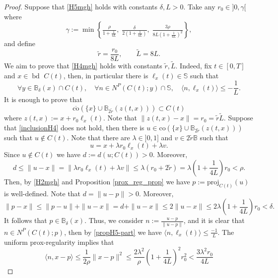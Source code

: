 \documentclass[preprint,12pt]{elsarticle}
\def \B{\mathbb{B}}
\newcommand{\bd}{{\operatorname{bd \ }}}
\theoremstyle{plain}
\theoremstyle{definition}
\theoremstyle{remark}
\begin{document}
    \begin{proof} Suppose that \ref{H5mgh} holds with constants $\delta, L>0$. Take any $r_0\in ]0,\gamma[$ where
    \[
\gamma:=
\min\left\{
\tfrac{\rho}{1+\frac{1}{4L}},
\;
\tfrac{\delta}{2\left(1+\frac{1}{4L}\right)},
\;
\tfrac{3\rho}{8L\left(1+\frac{1}{4L}\right)^2}
\right\},
\]
and define
\[
\tilde r=\frac{r_0}{8L},
\qquad
\tilde L=8L.
\]
We aim to prove that \ref{H4mgh} holds with constants $\tilde{r}, \tilde{L}$. Indeed, fix $t\in [0,T]$ and $x\in \bd C(t)$, then, in particular there is $\ell_x(t)\in \mathbb{S}$ such that
\begin{equation}\label{propH5-part} 
    \forall y\in \B_\delta(x)\cap C(t),\quad
\forall n\in N^P(C(t);y)\cap \mathbb{S},
\quad \langle n,\ell_x(t)\rangle \le -\frac{1}{L}.
\end{equation}
It is enough to prove that
\begin{equation}\label{inclusionH4}
    \overline{\text{co}}(\{x\}\cup \mathbb{B}_{2\tilde{r}}(z(t,x)))\subset C(t)
\end{equation}
where $z(t,x) := x+r_0\ell_x(t)$. Note that $\|z(t,x)-x\| = r_0 = \tilde{r}\tilde{L}$. Suppose that \eqref{inclusionH4} does not hold, then there is $u\in\text{co}(\{x\}\cup \mathbb{B}_{2\tilde{r}}(z(t,x)))$ such that $u\notin C(t)$. Note that there are $\lambda\in ]0,1]$ and $v\in 2\tilde{r}\mathbb{B}$ such that $$u = x+\lambda r_0\ell_x(t) + \lambda v.$$
Since $u\notin C(t)$ we have $d:=d(u;C(t))>0$. Moreover,
\begin{equation*}
    d\leq \|u-x\| = \|\lambda r_0\ell_x(t) + \lambda v\|\leq \lambda(r_0 + 2\tilde{r}) = \lambda\left(1+\frac{1}{4L}\right)r_0<\rho.
\end{equation*}
Then, by \ref{H2mgh} and Proposition \ref{prox_reg_prop} we have $p:=\text{proj}_{C(t)}(u)$ is well-defined. Note that $d = \|u-p\|>0$. Moreover,
\begin{equation*}
    \|p-x\|\leq \|p-u\| + \|u-x\| = d+\|u-x\|\leq 2\|u-x\|\leq 2\lambda\left(1+\frac{1}{4L}\right)r_0<\delta.
\end{equation*}
It follows that $p\in \mathbb{B}_\delta(x)$. Thus, we consider $n:= \frac{u-p}{\|u-p\|}$, and it is clear that $n\in N^P(C(t);p)$, then by \eqref{propH5-part} we have $\langle n,\ell_x(t)\rangle\leq \frac{-1}{L}$.
The uniform prox-regularity implies that 
\begin{equation}\label{bound1-H4}
    \langle n,x-p\rangle\leq \frac{1}{2\rho}\|x-p\|^2\leq \frac{2\lambda^2}{\rho}\left(1+\frac{1}{4L}\right)^2r_0^2<\frac{3\lambda^2 r_0}{4L}
\end{equation}

\end{proof}
\end{document}
